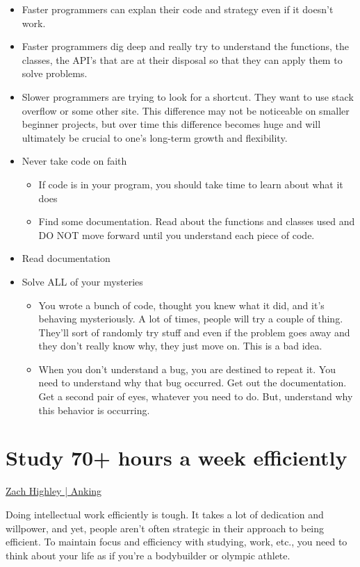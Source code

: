 \begin{itemize}
	\item
	Faster programmers can explan their code and strategy even if it  doesn't work.
	\item
	Faster programmers dig deep and really try to understand the functions, the classes, the API's that are at their disposal so that they can apply them to solve problems.
	\item
	Slower programmers are trying to look for a shortcut. They want to use stack overflow or some other site. This difference may not be noticeable on smaller beginner projects, but over time this difference becomes huge and will ultimately be crucial to one's long-term growth and flexibility.
	\item
	Never take code on faith

	\begin{itemize}
		\item
		If code is in your program, you should take time to learn about what it does
		\item
		Find some documentation. Read about the functions and classes used and DO NOT move forward until you understand each piece of code.
	\end{itemize}
	\item
	Read documentation
	\item
	Solve ALL of your mysteries
	\begin{itemize}
		\item
		You wrote a bunch of code, thought you knew what it did, and it's behaving mysteriously. A lot of times, people will try a couple of thing. They'll sort of randomly try stuff and even if the problem goes away and they don't really know why, they just move on. This is a bad idea.
		\item
		When you don't understand a bug, you are destined to repeat it. You need to understand why that bug occurred. Get out the documentation. Get a second pair of eyes, whatever you need to do. But, understand why this behavior is occurring.
	\end{itemize}
\end{itemize}

\section{Study 70+ hours a week efficiently}

\href{https://youtu.be/FARXrLsBNJY}{Zach Highley | Anking}

Doing intellectual work efficiently is tough. It takes a lot of dedication and willpower, and yet, people aren't often strategic in their approach to being efficient. To maintain focus and efficiency with studying, work, etc., you need to think about your life as if you're a bodybuilder or olympic athlete. 

